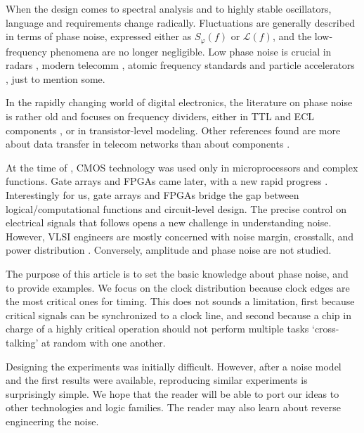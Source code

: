 \documentclass{article}
\begin{document}
When the design comes to spectral analysis and to highly stable oscillators, language and requirements change radically. 
Fluctuations are generally described in terms of phase noise, expressed either as $S_\varphi(f)$ or $\mathscr{L}(f)$, and the low-frequency phenomena are no longer negligible.
Low phase noise is crucial in radars \cite{Skolnik-2002,Skolnik-2008,Krieger-2006}, modern telecomm \cite{Esman-2016}, atomic frequency standards \cite{FSM-2015} and particle accelerators \cite{Serrano-2011,Jablonski-2015}, just to mention some.

In the rapidly changing world of digital electronics, the literature on phase noise is rather old and focuses on frequency dividers, either in TTL and ECL components \cite{Phillips-1987,Egan-1990}, or in transistor-level modeling.  Other references found are more about data transfer in telecom networks than about components \cite{Reinhardt-2005,Bregni-2002,Kihara-1989}.

At the time of \cite{Phillips-1987,Egan-1990}, CMOS technology was used only in microprocessors and complex functions. 
Gate arrays and FPGAs came later, with a new rapid progress
\cite{Mack-2015,Huang-2015,Moore-50y}.  
Interestingly for us, gate arrays and FPGAs bridge the gap between logical/computational functions and circuit-level design.  The precise control on electrical signals that follows opens a new challenge in understanding noise.
However, VLSI engineers are mostly concerned with noise margin, crosstalk, and power distribution \cite{Weste-2011}.  Conversely, amplitude and phase noise are not studied.

The purpose of this article is to set the basic knowledge about phase noise, and to provide examples.  We focus on the clock distribution because clock edges are the most critical ones for timing.  This does not sounds a limitation, first because critical signals can be synchronized to a clock line, and second because a chip in charge of a highly critical operation should not perform multiple tasks `cross-talking' at random with one another.

Designing the experiments was initially difficult.  However, after a noise model and the first results were available, reproducing similar experiments is surprisingly simple.  We hope that the reader will be able to port our ideas to other technologies and logic families.  The reader may also learn about reverse engineering the noise.
\end{document}
